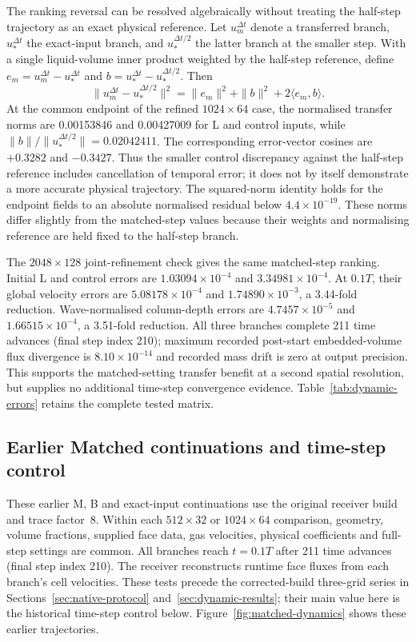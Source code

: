\documentclass[10pt]{article}
\begin{document}
The ranking reversal can be resolved algebraically without treating the
half-step trajectory as an exact physical reference. Let $u_m^{\Delta t}$
denote a transferred branch, $u_*^{\Delta t}$ the exact-input branch, and
$u_*^{\Delta t/2}$ the latter branch at the smaller step. With a single
liquid-volume inner product weighted by the half-step reference, define
$e_m=u_m^{\Delta t}-u_*^{\Delta t}$ and
$b=u_*^{\Delta t}-u_*^{\Delta t/2}$. Then
\begin{equation}
 \|u_m^{\Delta t}-u_*^{\Delta t/2}\|^2
 =\|e_m\|^2+\|b\|^2+2\langle e_m,b\rangle.
 \label{eq:temporal-error-decomposition}
\end{equation}
At the common endpoint of the refined $1024\times64$ case, the normalised
transfer norms are 0.00153846 and 0.00427009 for L and control inputs,
while $\|b\|/\|u_*^{\Delta t/2}\|=0.02042411$. The corresponding error-vector
cosines are $+0.3282$ and $-0.3427$. Thus the smaller control discrepancy
against the half-step reference includes cancellation of temporal error;
it does not by itself demonstrate a more accurate physical trajectory.
The squared-norm identity holds for the endpoint fields
to an absolute normalised residual below $4.4\times10^{-19}$.
These norms differ slightly from the matched-step values because their
weights and normalising reference are held fixed to the half-step branch.

The $2048\times128$ joint-refinement check gives the same matched-step
ranking. Initial L and control errors are
$1.03094\times10^{-4}$ and $3.34981\times10^{-4}$. At $0.1T$, their global
velocity errors are $5.08178\times10^{-4}$ and $1.74890\times10^{-3}$,
a 3.44-fold reduction. Wave-normalised column-depth errors are
$4.7457\times10^{-5}$ and $1.66515\times10^{-4}$, a 3.51-fold reduction.
All three branches complete 211 time advances (final step index 210); maximum recorded post-start
embedded-volume flux divergence is $8.10\times10^{-14}$ and recorded mass
drift is zero at output precision. This supports the matched-setting
transfer benefit at a second spatial resolution, but supplies no additional
time-step convergence evidence. Table~\ref{tab:dynamic-errors} retains the
complete tested matrix.




\subsection{Earlier Matched continuations and time-step control}\label{app:old-matched}
These earlier M, B and exact-input continuations use the original receiver
build and trace factor~8. Within each $512\times32$ or $1024\times64$
comparison, geometry, volume fractions, supplied face data, gas velocities,
physical coefficients and full-step settings are common. All branches reach
$t=0.1T$ after 211 time advances (final step index 210). The receiver reconstructs runtime face fluxes from
each branch's cell velocities. These tests precede the corrected-build
three-grid series in Sections~\ref{sec:native-protocol} and~\ref{sec:dynamic-results}; their main value here
is the historical time-step control below.
Figure~\ref{fig:matched-dynamics} shows these earlier trajectories.
\end{document}

